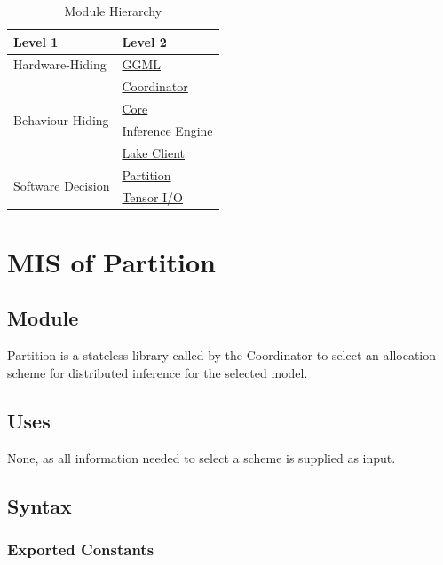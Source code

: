 \documentclass[12pt, titlepage]{article}
\begin{document}
\begin{table}[h!]
\centering
\begin{tabular}{p{} p{}}
\toprule
\textbf{Level 1} & \textbf{Level 2}\\
\midrule

{Hardware-Hiding} & \hyperref[mis:ggml]{GGML} \\
\midrule

\multirow{4}{0.3\textwidth}{Behaviour-Hiding} & \hyperref[mis:coordinator]{Coordinator}\\
& \hyperref[mis:core]{Core}\\
& \hyperref[mis:ie]{Inference Engine}\\
& \hyperref[mis:lc]{Lake Client}\\
\midrule

\multirow{2}{0.3\textwidth}{Software Decision} & \hyperref[mis:partition]{Partition}\\
& \hyperref[mis:tensorio]{Tensor I/O}\\
\bottomrule

\end{tabular}
\caption{Module Hierarchy}
\label{TblMH}
\end{table}

\newpage

\section{MIS of Partition} \label{mis:partition}
\begingroup
\setlength{\emergencystretch}{3em}

\subsection{Module}

Partition is a stateless library called by the Coordinator to select an allocation
scheme for distributed inference for the selected model.

\subsection{Uses}

None, as all information needed to select a scheme is supplied as input.

\subsection{Syntax}

\subsubsection{Exported Constants}
\end{document}
